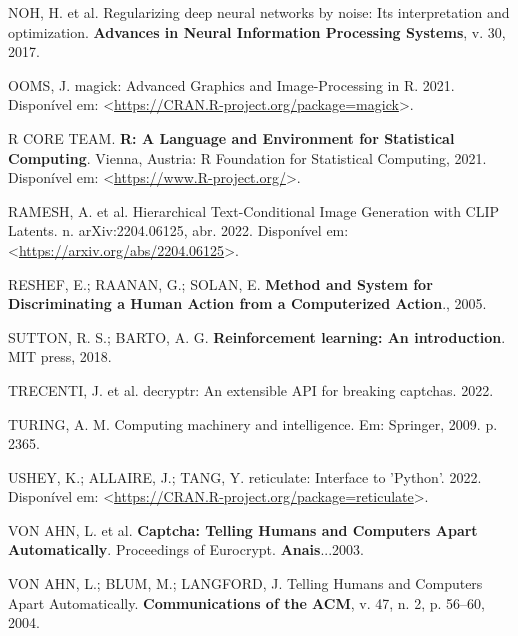 \documentclass[12pt,twoside,brazilian]{book}
\newlength{\cslhangindent}
\newlength{\cslentryspacingunit} %
\newenvironment{CSLReferences}[2] %
 {%
  \setlength{\parindent}{0pt}
  \ifodd #1
  \let\oldpar\par
  \def\par{\hangindent=\cslhangindent\oldpar}
  \fi
  \setlength{\parskip}{#2\cslentryspacingunit}
 }%
 {}
\begin{document}
\begin{CSLReferences}{0}{1}
\leavevmode{}%
NOH, H. et al. Regularizing deep neural networks by noise: Its
interpretation and optimization. \textbf{Advances in Neural Information
Processing Systems}, v. 30, 2017.

\leavevmode{}%
OOMS, J. magick: Advanced Graphics and Image-Processing in R. 2021.
Disponível em:
\textless{}\url{https://CRAN.R-project.org/package=magick}\textgreater.

\leavevmode{}%
R CORE TEAM. \textbf{R: A Language and Environment for Statistical
Computing}. Vienna, Austria: R Foundation for Statistical Computing,
2021. Disponível em:
\textless{}\url{https://www.R-project.org/}\textgreater.

\leavevmode{}%
RAMESH, A. et al. Hierarchical {Text-Conditional Image Generation} with
{CLIP Latents}. n. arXiv:2204.06125, abr. 2022. Disponível em:
\textless{}\url{https://arxiv.org/abs/2204.06125}\textgreater.

\leavevmode{}%
RESHEF, E.; RAANAN, G.; SOLAN, E. \textbf{Method and System for
Discriminating a Human Action from a Computerized Action}., 2005.

\leavevmode{}%
SUTTON, R. S.; BARTO, A. G. \textbf{Reinforcement learning: An
introduction}. MIT press, 2018.

\leavevmode{}%
TRECENTI, J. et al. decryptr: An extensible API for breaking captchas.
2022.

\leavevmode{}%
TURING, A. M. Computing machinery and intelligence. Em: Springer, 2009.
p. 2365.

\leavevmode{}%
USHEY, K.; ALLAIRE, J.; TANG, Y. reticulate: Interface to 'Python'.
2022. Disponível em:
\textless{}\url{https://CRAN.R-project.org/package=reticulate}\textgreater.

\leavevmode{}%
VON AHN, L. et al. \textbf{Captcha: {Telling} Humans and Computers Apart
Automatically}. Proceedings of Eurocrypt. \textbf{Anais}...2003.

\leavevmode{}%
VON AHN, L.; BLUM, M.; LANGFORD, J. Telling Humans and Computers Apart
Automatically. \textbf{Communications of the ACM}, v. 47, n. 2, p.
56--60, 2004.


\end{CSLReferences}
\end{document}
